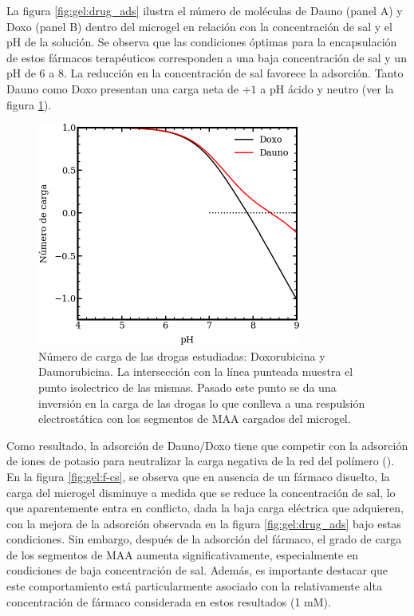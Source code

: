 La figura \ref{fig:gel:drug_ads} ilustra el n\'umero de mol\'eculas de Dauno (panel A) y Doxo (panel B) dentro del microgel en relaci\'on con la concentraci\'on de sal y el pH de la soluci\'on. Se observa que las condiciones \'optimas para la encapsulaci\'on de estos f\'armacos terap\'euticos corresponden a una baja concentraci\'on de sal y un pH de 6 a 8. La reducci\'on en la concentraci\'on de sal favorece la adsorci\'on. Tanto Dauno como Doxo presentan una carga neta de $+1$ a pH \'acido y neutro (ver la figura \ref{fig:gel:carga-drug_ads}).

\begin{figure}[!tb]
	\centering
	\includegraphics[width=0.45\linewidth]{Figures/graph-gel/drugs-Q.pdf}
	\caption{N\'umero de carga de las drogas estudiadas: Doxorubicina y Daunorubicina. La intersecci\'on con la l\'inea punteada muestra el punto isolectrico de las mismas. Pasado este punto se da una inversi\'on en la carga de las drogas lo que conlleva a una respulsi\'on electrost\'atica con los segmentos de MAA cargados del microgel. }
	\label{fig:gel:carga-drug_ads}
\end{figure}

Como resultado, la adsorci\'on de Dauno/Doxo tiene que competir con la adsorci\'on de iones de potasio para neutralizar la carga negativa de la red del pol\'imero (\citet{perez2020triggering}). En la figura \ref{fig:gel:f-cs}, se observa que en ausencia de un f\'armaco disuelto, la carga del microgel disminuye a medida que se reduce la concentraci\'on de sal, lo que aparentemente entra en conflicto, dada la baja carga el\'ectrica que adquieren, con la mejora de la adsorci\'on observada en la figura \ref{fig:gel:drug_ads} bajo estas condiciones. Sin embargo, despu\'es de la adsorci\'on del f\'armaco, el grado de carga de los segmentos de MAA aumenta significativamente, especialmente en condiciones de baja concentraci\'on de sal. Adem\'as, es importante destacar que este comportamiento est\'a particularmente asociado con la relativamente alta concentraci\'on de f\'armaco considerada en estos resultados (1 mM).

